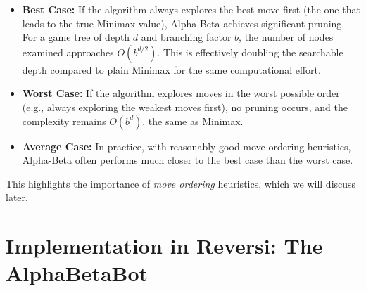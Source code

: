 \documentclass[11pt]{article}
\begin{document}
\begin{itemize}
    \item \textbf{Best Case:} If the algorithm always explores the best move first (the one that leads to the true Minimax value), Alpha-Beta achieves significant pruning. For a game tree of depth $d$ and branching factor $b$, the number of nodes examined approaches $O(b^{d/2})$. This is effectively doubling the searchable depth compared to plain Minimax for the same computational effort.
    \item \textbf{Worst Case:} If the algorithm explores moves in the worst possible order (e.g., always exploring the weakest moves first), no pruning occurs, and the complexity remains $O(b^d)$, the same as Minimax.
    \item \textbf{Average Case:} In practice, with reasonably good move ordering heuristics, Alpha-Beta often performs much closer to the best case than the worst case.
\end{itemize}

This highlights the importance of \textit{move ordering} heuristics, which we will discuss later.

\section{Implementation in Reversi: The AlphaBetaBot}
\end{document}
